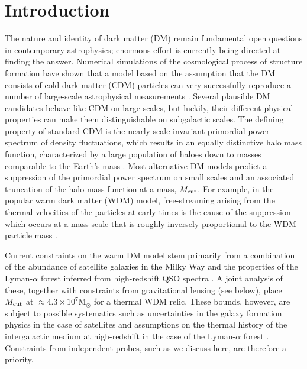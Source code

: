 \documentclass[a4paper, fleqn, usenatbib, useAMS]{mnras}
\def\mcut{M_{\rm cut}}
\begin{document}
\section{Introduction}
The nature and identity of dark matter (DM) remain fundamental
open questions in contemporary astrophysics; enormous effort is
currently being directed at finding the answer. 
Numerical simulations of the cosmological process of structure
formation \citep[e.g.][]{Davies1985,Springel2005,Frenk2012} have shown
that a model based on the assumption that the DM consists of 
cold dark matter (CDM) particles can very successfully reproduce a number of large-scale astrophysical measurements 
\citep[e.g.][]{Planck2018, Wang2016, Alam2017}. 
Several plausible DM candidates behave like CDM on large scales, 
but luckily, their different physical properties can make them
distinguishable on subgalactic scales. 
The defining property of standard CDM is the nearly scale-invariant primordial power-spectrum 
of density fluctuations, which results in an equally distinctive halo
mass function, characterized by a large 
population of haloes down to masses comparable to the Earth's mass \citep{Jenkins2001, Diemand2008, 
Angulo2012, Green2005, Wang2020}. Most alternative DM models predict a
suppression of the primordial power spectrum on small scales and an
associated truncation of the halo mass function at a mass, $\mcut$. For example, in the
popular warm dark matter (WDM) model, free-streaming arising from the
thermal velocities of the particles at
early times is the cause of the suppression which occurs at a mass
scale that is roughly inversely proportional to the WDM particle mass 
\citep[e.g.][]{Avila2003, Schneider2012, Lovell2012, Bose16}.

Current constraints on the warm DM model stem primarily from a
combination of the abundance of satellite galaxies in the Milky Way
\citep{Kennedy2014,Lovell2012,Lovell2016,Newton2020} and the properties of the 
Lyman-$\alpha$ forest inferred from high-redshift QSO spectra 
\citep{Viel2013, Baur2016,Irsic2017}.  A joint analysis of these,
together with 
constraints from gravitational lensing (see below), 
place $\mcut$ at  
$\approx 4.3 \times 10^{7}$M$_\odot$ for a thermal WDM relic. These bounds, however, are
subject to possible systematics such as uncertainties in the galaxy
formation physics in the case of satellites \citep{Newton2020} and 
assumptions on the thermal history of the intergalactic medium at
high-redshift in the case of the Lyman-$\alpha$ forest
\citep[e.g.][]{Garzilli2017,Garzilli2019}.  Constraints from
independent probes, such as we discuss here, are therefore a priority.
\end{document}
